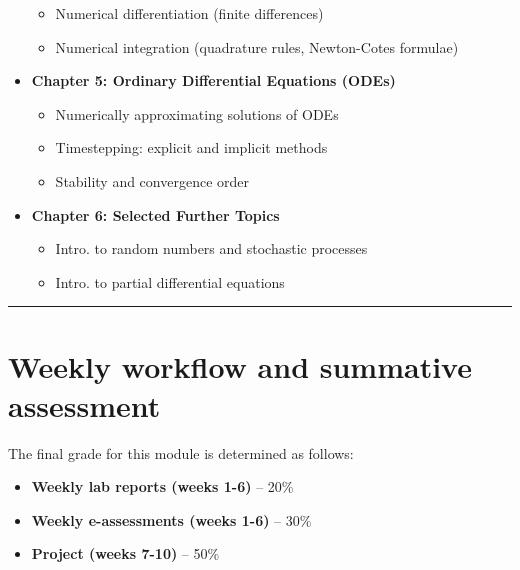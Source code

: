 \documentclass[
  letterpaper,
  DIV=11,
  numbers=noendperiod]{scrreprt}
\providecommand{\tightlist}{%
  \setlength{\itemsep}{0pt}\setlength{\parskip}{0pt}}
\begin{document}
\begin{itemize}
  \begin{itemize}
  \tightlist
  \item
    Numerical differentiation (finite differences)
  \item
    Numerical integration (quadrature rules, Newton-Cotes formulae)
  \end{itemize}
\item
  \textbf{Chapter 5: Ordinary Differential Equations (ODEs)}

  \begin{itemize}
  \tightlist
  \item
    Numerically approximating solutions of ODEs
  \item
    Timestepping: explicit and implicit methods
  \item
    Stability and convergence order
  \end{itemize}
\item
  \textbf{Chapter 6: Selected Further Topics}

  \begin{itemize}
  \tightlist
  \item
    Intro. to random numbers and stochastic processes
  \item
    Intro. to partial differential equations
  \end{itemize}
\end{itemize}

\begin{center}\rule{0.5\linewidth}{0.5pt}\end{center}

\section*{Weekly workflow and summative
assessment}\label{weekly-workflow-and-summative-assessment}


The final grade for this module is determined as follows:

\begin{itemize}
\tightlist
\item
  \textbf{Weekly lab reports (weeks 1-6)} -- 20\%
\item
  \textbf{Weekly e-assessments (weeks 1-6)} -- 30\%
\item
  \textbf{Project (weeks 7-10)} -- 50\%
\end{itemize}
\end{document}
